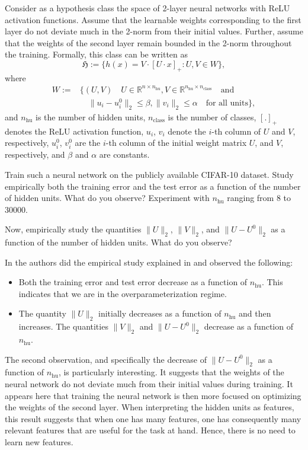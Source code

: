 \begin{boxedexample}
	\label{ex:generalization}
	Consider as a hypothesis class the space of 2-layer neural networks with ReLU
	activation functions. Assume that the learnable weights
	corresponding to the first layer do not deviate much in the 2-norm from
	their initial values. Further, assume that the weights of the second layer
	remain bounded in the 2-norm throughout the training. Formally, this class can be written as
	$$
		\mathfrak{H} := \{h(x) = V \cdot [U\cdot x]_+: U, V \in W\},
		$$
		where
		\begin{align*}
		W :=& \{(U,V) \quad U \in \mathbb{R}^{n \times n_{\text{hu}}}, V \in \mathbb{R}^{n_\text{hu} \times n_{\text{class}}} \quad \text{and}\\
		& \quad \|u_i-u_i^0\|_2 \leq \beta, \|v_i\|_2 \leq \alpha \quad \text{for all units}\}, 
		\end{align*}
		and $n_\text{hu}$ is the number of hidden units, $n_{\text{class}}$ is the
		number of classes, $[.]_+$ denotes the ReLU activation function, $u_i$,
		$v_i$ denote the $i$-th column of $U$ and $V$, respectively, $u_i^0$, $v_i^0$ are the $i$-th column of the
		initial weight matrix $U$, and $V$, respectively, and $\beta$ and $\alpha$ are
		constants.		

		Train such a neural network on the publicly available CIFAR-10 dataset.
		Study empirically both the training error and the test error as a
		function of the number of hidden units. What do you observe? Experiment
		with $n_{\text{hu}}$ ranging from 8 to 30000. 

		Now, empirically study the quantities $\|U\|_2$, $\|V\|_2$, and
		$\|U-U^0\|_2$ as a function of the number of hidden units. What do you observe?
\end{boxedexample}

In \cite{Neyshabur:arXiv1805} the authors did the empirical study explained in
 and observed the following:
\begin{itemize}
	\item Both the training error and test error decrease as a function of
	$n_{\text{hu}}$. This indicates that we are in the overparameterization
	regime.
	\item The quantity $\|U\|_2$ initially decreases as a function of
	$n_{\text{hu}}$ and then increases. The quantities $\|V\|_2$ and
	$\|U-U^0\|_2$ decrease as a function of $n_{\text{hu}}$. 
\end{itemize}
The second observation, and specifically the decrease of $\|U-U^0\|_2$ as a
function of $n_{\text{hu}}$, is particularly interesting. It suggests that the
weights of the neural network do not deviate much from their initial values
during training. It appears here that training the neural network is then more
focused on optimizing the weights of the second layer. When interpreting the
hidden units as features, this result suggests that when one has many features,
one has consequently many relevant features that are useful for the task at
hand. Hence, there is no need to learn new features. 

